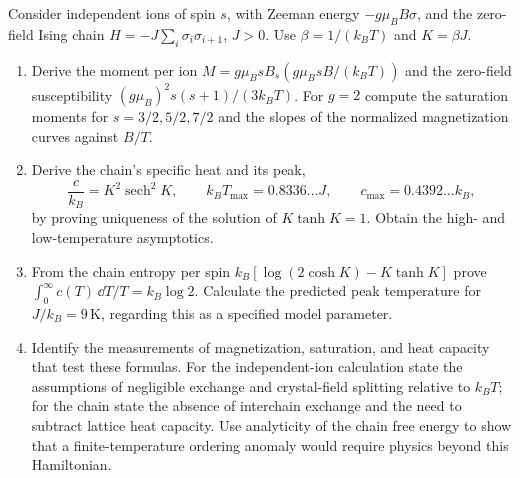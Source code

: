 \begin{exercise}
Consider independent ions of spin $s$, with Zeeman energy
$-g\mu_BB\sigma$, and the zero-field Ising chain
$H=-J\sum_i\sigma_i\sigma_{i+1}$, $J>0$.
Use $\beta=1/(k_BT)$ and $K=\beta J$.
\begin{enumerate}[label=(\alph*)]
\item Derive the moment per ion
$M=g\mu_BsB_s(g\mu_BsB/(k_BT))$ and the zero-field
susceptibility $(g\mu_B)^2s(s+1)/(3k_BT)$.
For $g=2$ compute the saturation moments for
$s=3/2,5/2,7/2$ and the slopes of the normalized
magnetization curves against $B/T$.
\item Derive the chain's specific heat and its peak,
\[
 \frac c{k_B}=K^2\operatorname{sech}^2K,\qquad
 k_BT_{\max}=0.8336\ldots J,\qquad
 c_{\max}=0.4392\ldots k_B,
\]
by proving uniqueness of the solution of $K\tanh K=1$.
Obtain the high- and low-temperature asymptotics.
\item From the chain entropy per spin
$k_B[\log(2\cosh K)-K\tanh K]$ prove
$\int_0^\infty c(T)\,\dd T/T=k_B\log2$.
Calculate the predicted peak temperature for $J/k_B=9\,\mathrm K$,
regarding this as a specified model parameter.
\item Identify the measurements of magnetization, saturation,
and heat capacity that test these formulas.
For the independent-ion calculation state the assumptions of
negligible exchange and crystal-field splitting relative
to $k_BT$; for the chain state the absence of interchain
exchange and the need to subtract lattice heat capacity.
Use analyticity of the chain free energy to show that a
finite-temperature ordering anomaly would require physics
beyond this Hamiltonian.
\end{enumerate}
\end{exercise}
